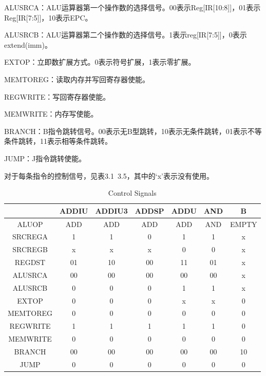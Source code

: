 ALUSRCA：ALU运算器第一个操作数的选择信号。00表示Reg[IR[10:8]]，01表示Reg[IR[7:5]]，10表示EPC。

ALUSRCB：ALU运算器第二个操作数的选择信号。1表示reg[IR[7:5]]，0表示extend(imm)。

EXTOP：立即数扩展方式。0表示符号扩展，1表示零扩展。

MEMTOREG：读取内存并写回寄存器使能。

REGWRITE：写回寄存器使能。

MEMWRITE：内存写使能。

BRANCH：B指令跳转信号。00表示无B型跳转，10表示无条件跳转，01表示不等条件跳转，11表示相等条件跳转。

JUMP：J指令跳转使能。

对于每条指令的控制信号，见表3.1~3.5，其中的‘x'表示没有使用。

\begin{center}
\begin{table}[H]
\caption{Control Signals}
\label{tab:treatments}
\begin{tabular}{|c|cccccc|}
\hline
& ADDIU & ADDIU3 & ADDSP & ADDU & AND & B \\
\hline
ALUOP & ADD	& ADD & ADD & ADD & AND & EMPTY\\	
\hline
SRCREGA & 1 & 1 & 0 & 1 & 1 & x\\
\hline
SRCREGB & x & x & x & 0 & 0 & x\\
\hline
REGDST & 01 & 10 & 00 & 11 & 01 & x\\
\hline
ALUSRCA & 00 & 00 & 00 & 00 & 00 & x\\
\hline
ALUSRCB & 0 & 0 & 0 & 1 & 1 & x\\
\hline
EXTOP & 0 & 0 & 0 & x & x & 0\\
\hline
MEMTOREG & 0 & 0 & 0 & 0 & 0 & 0\\
\hline
REGWRITE & 1 & 1 & 1 & 1 & 1 & 0\\
\hline
MEMWRITE & 0 & 0 & 0 & 0 & 0 & 0\\
\hline
BRANCH & 00 & 00 & 00 & 00 & 00 & 10\\
\hline
JUMP & 0 & 0 & 0 & 0 & 0 & 0\\
\hline
\end{tabular}
\end{table}
\end{center}

